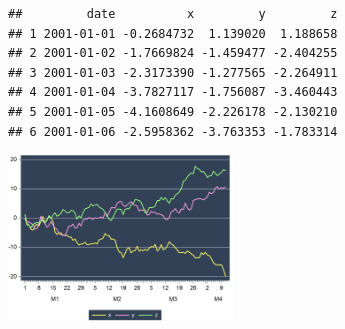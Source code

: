 \documentclass[
]{article}
\begin{document}
\begin{verbatim}
##         date          x         y         z
## 1 2001-01-01 -0.2684732  1.139020  1.188658
## 2 2001-01-02 -1.7669824 -1.459477 -2.404255
## 3 2001-01-03 -2.3173390 -1.277565 -2.264911
## 4 2001-01-04 -3.7827117 -1.756087 -3.460443
## 5 2001-01-05 -4.1608649 -2.226178 -2.130210
## 6 2001-01-06 -2.5958362 -3.763353 -1.783314
\end{verbatim}

\begin{center}\includegraphics[width=0.45\textwidth]{test_engEviews_files/figure-latex//rwalk-xyz} \end{center}
\end{document}

